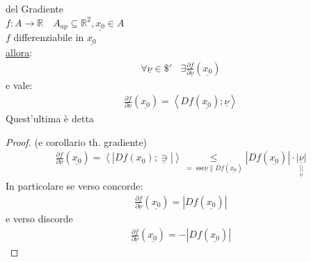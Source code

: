\documentclass[a4paper, oneside]{article}
\begin{document}
        \begin{theorem}
            del Gradiente\\
             $f:A \to \mathbb{R} \quad A_{ap} \subseteq \mathbb{R}^2,\underline{x_0} \in A$\\
             $f$ differenziabile in $\underline{x_0}$\\
            \underline{allora}:
            \begin{gather*}
                \forall \underline{ \nu} \in \mathdollar ' \ \ \ \ \exists \frac{\partial f}{\partial \underline{\nu}}(\underline{x_0})
            \end{gather*}
            e vale:
            \begin{gather*}
                \frac{\partial f}{\partial \underline{ \nu}}(\underline{x_0}) = \left\langle Df(\underline{x_0});\underline{\nu}\right\rangle 
            \end{gather*}
            Quest'ultima è detta 
        \end{theorem}
        \begin{proof}(e corollario th. gradiente)
            \begin{gather*}
                \frac{\partial f}{\partial \underline{\nu}}(\underline{x_0}) = \left\langle \left\lvert  Df(x_0);\underline{\ni} \right\rvert  \right\rangle  \underset{= \text{ sse} \underline{\nu} \parallel Df(\underline{x_0})}{\leq} \left\lvert Df(\underline{x_0})\right\rvert \cdot \underset{\underset{0}{||}}{|\underline{\nu}|}            \end{gather*}
        In particolare se verso concorde:
        \begin{gather*}
            \frac{\partial f}{\partial \underline{\nu}}(\underline{x_0}) = \left\lvert Df(\underline{x_0})\right\rvert 
        \end{gather*}
        e verso discorde
        \begin{gather*}
            \frac{\partial f}{\partial \underline{\nu}}(\underline{x_0}) = -\left\lvert Df(\underline{x_0})\right\rvert 
        \end{gather*}
        \end{proof}
\end{document}
